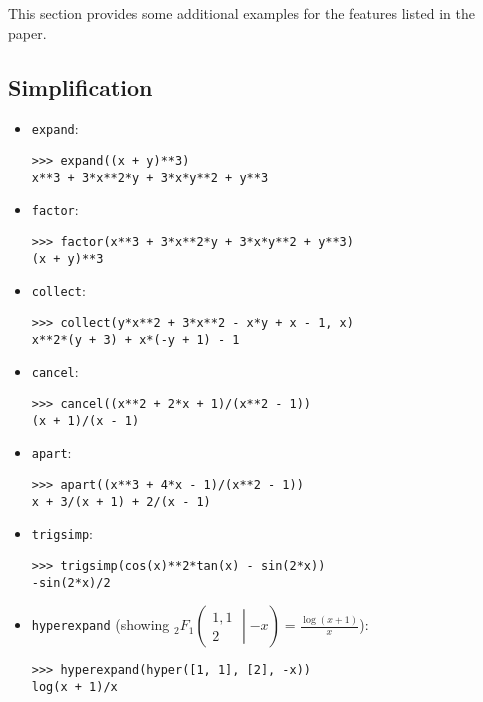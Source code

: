 This section provides some additional examples for the features listed
in the paper.

\subsection{Simplification}
\begin{itemize}
\item \texttt{expand}:
\begin{verbatim}
>>> expand((x + y)**3)
x**3 + 3*x**2*y + 3*x*y**2 + y**3
\end{verbatim}

\item \texttt{factor}:
\begin{verbatim}
>>> factor(x**3 + 3*x**2*y + 3*x*y**2 + y**3)
(x + y)**3
\end{verbatim}

\item \texttt{collect}:
\begin{verbatim}
>>> collect(y*x**2 + 3*x**2 - x*y + x - 1, x)
x**2*(y + 3) + x*(-y + 1) - 1
\end{verbatim}

\item \texttt{cancel}:
\begin{verbatim}
>>> cancel((x**2 + 2*x + 1)/(x**2 - 1))
(x + 1)/(x - 1)
\end{verbatim}

\item \texttt{apart}:
\begin{verbatim}
>>> apart((x**3 + 4*x - 1)/(x**2 - 1))
x + 3/(x + 1) + 2/(x - 1)
\end{verbatim}

\item \texttt{trigsimp}:
\begin{verbatim}
>>> trigsimp(cos(x)**2*tan(x) - sin(2*x))
-sin(2*x)/2
\end{verbatim}

\item \texttt{hyperexpand} (showing ${{}_{2}F_{1}\left(\begin{matrix} 1, 1 \\
        2 \end{matrix}\middle| {- x} \right)} = \frac{\log{\left (x + 1 \right )}}{x}$):
\begin{verbatim}
>>> hyperexpand(hyper([1, 1], [2], -x))
log(x + 1)/x
\end{verbatim}
\end{itemize}

